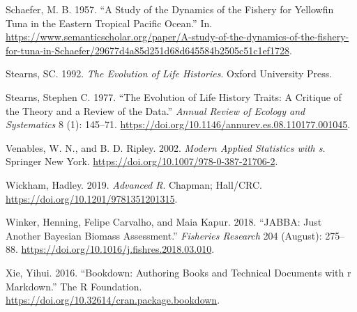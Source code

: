 \documentclass[
  lang=cn,
  11pt,
  scheme=chinese,
  chinesefont=nofont,
  citestyle=gb7714-2015,
  bibstyle=gb7714-2015]{elegantbook}
\newlength{\cslhangindent}
\newenvironment{CSLReferences}[2] %
 {\begin{list}{}{%
  \setlength{\itemindent}{0pt}
  \setlength{\leftmargin}{0pt}
  \setlength{\parsep}{0pt}
  \ifodd #1
   \setlength{\leftmargin}{\cslhangindent}
   \setlength{\itemindent}{-1\cslhangindent}
  \fi
  \setlength{\itemsep}{#2\baselineskip}}}
 {\end{list}}
\begin{document}
\begin{CSLReferences}{1}{0}
Schaefer, M. B. 1957. {``A Study of the Dynamics of the Fishery for Yellowfin Tuna in the Eastern Tropical Pacific Ocean.''} In. \url{https://www.semanticscholar.org/paper/A-study-of-the-dynamics-of-the-fishery-for-tuna-in-Schaefer/29677d4a85d251d68d645584b2505c51c1ef1728}.

Stearns, SC. 1992. \emph{The Evolution of Life Histories}. Oxford University Press.

Stearns, Stephen C. 1977. {``The Evolution of Life History Traits: A Critique of the Theory and a Review of the Data.''} \emph{Annual Review of Ecology and Systematics} 8 (1): 145--71. \url{https://doi.org/10.1146/annurev.es.08.110177.001045}.

Venables, W. N., and B. D. Ripley. 2002. \emph{Modern Applied Statistics with s}. Springer New York. \url{https://doi.org/10.1007/978-0-387-21706-2}.

Wickham, Hadley. 2019. \emph{Advanced R}. Chapman; Hall/CRC. \url{https://doi.org/10.1201/9781351201315}.

Winker, Henning, Felipe Carvalho, and Maia Kapur. 2018. {``JABBA: Just Another Bayesian Biomass Assessment.''} \emph{Fisheries Research} 204 (August): 275--88. \url{https://doi.org/10.1016/j.fishres.2018.03.010}.

Xie, Yihui. 2016. {``Bookdown: Authoring Books and Technical Documents with r Markdown.''} The R Foundation. \url{https://doi.org/10.32614/cran.package.bookdown}.

\end{CSLReferences}
\end{document}
